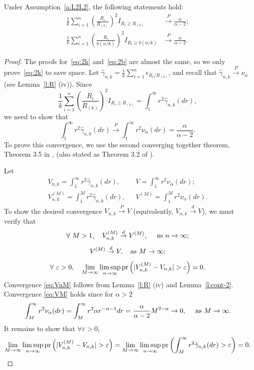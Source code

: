 \documentclass[lineno]{biometrika}
\newcommand \ag{\alpha}
\newcommand \ga{\gamma}
\newcommand \eg{\varepsilon}
\newcommand \ep{\epsilon}
\newcommand\lp{\left (}
\newcommand\rp{\right )}
\def\convP{\stackrel{\mbox{$\scriptstyle P$}}{\rightarrow}}
\def\convd{\stackrel{\mbox{$\scriptstyle d$}}{\rightarrow}}
\begin{document}
\begin{lemma} \label{l:22}
Under Assumption~\ref{a:L2L2}, the following statements hold:
\begin{align}
\frac{1}{k}\sum_{i=1}^n \lp \frac{R_i}{R_{(k)}} \rp^{2}   I_{R_i \ge R_{(k)} }  &\convP \frac{\ag}{\ag-2}; \label{eq:2k}\\
\frac{1}{k}\sum_{i=1}^n \lp \frac{R_i}{b(n/k)} \rp^{2}   I_{R_i \ge b(n/k) } &\convP \frac{\ag}{\ag-2}. \label{eq:2b}
\end{align}

\end{lemma}
\begin{proof}
The proofs for~\eqref{eq:2k} and~\eqref{eq:2b} are almost the same, so we only prove~\eqref{eq:2k} to save space. Let $\hat{\ga}_{n,k}=\frac{1}{k} \sum_{i=1}^n \ep_{R_i / R_{(k)}}$, and recall that $\hat{\ga}_{n,k} \convP \nu_{\ag}$ (see Lemma~\ref{l:R} (iv)). Since
\[
\frac{1}{k}\sum_{i=1}^n \lp \frac{R_i}{R_{(k)}} \rp^{2}   I_{R_i \ge R_{(k)} }= \int_1^\infty r^2 \hat{\ga}_{n,k}(dr),
\]
we need to show that
\[
\int_1^\infty r^2  \hat{\ga}_{n,k}(dr)
\convP \int_1^\infty r^{2} \nu_\ag(dr)=\frac{\ag}{\ag-2}.
\]
To prove this convergence, we use the second converging together theorem, Theorem 3.5
in \citet{resnick:2007}, (also stated as Theorem 3.2 of \citet{billingsley:1999}).

Let
\begin{align*}
V_{n,k} = \int_1^\infty r^2 \hat{\ga}_{n,k}(dr),  \ \ \
&  V= \int_1^\infty r^2 \nu_\ag(dr);\\
V_{n,k}^{(M)} = \int_1^M r^2 \hat{\ga}_{n,k}(dr),  \ \ \
& V^{(M)}= \int_1^M r^2 \nu_\ag(dr).
\end{align*}
To show the desired convergence $V_{n,k} \convP V$ (equivalently, $V_{n,k} \convd V$), we must verify that
\begin{equation} \label{eq:VnM}
\forall \ M > 1, \ \ \ V_{n,k}^{(M)} \convd V^{(M)}, \ \ \ \ {\rm as} \ n \to\infty;
\end{equation}
\begin{equation} \label{eq:VM}
V^{(M)} \convd V, \ \ \ {\rm as} \ M\to\infty;
\end{equation}
\begin{equation} \label{eq:bill}
\forall \ \eg > 0, \ \ \ \lim_{M\to\infty} \limsup_{n\to\infty}
 {\rm pr}\lp | V_{n,k}^{(M)}- V_{n,k} | > \eg \rp = 0.
\end{equation}
Convergence \eqref{eq:VnM} follows from Lemma~\ref{l:R} (iv)
and Lemma~\ref{l:cont-2}. Convergence \eqref{eq:VM} holds since for $\ag>2$
\[
\int_M^\infty r^2 \nu_\ag(dr)=\int_M^\infty r^2 \ag r^{-\ag-1} dr =\frac{\ag}{\ag-2} M^{2-\ag} \to 0, \ \ \ \ {\rm as}\ M \to \infty.
\]
It remains to show that $\forall \eg>0$,
\[
\lim_{M\to\infty} \limsup_{n\to\infty}
 {\rm pr}\lp | V_{n,k}^{(M)}- V_{n,k} | > \eg \rp =  \lim_{M\to\infty} \limsup_{n\to\infty}
 {\rm pr}\lp \int_M^\infty r^2 \hat\ga_{n,k}(dr) > \eg \rp = 0.
\]



\end{proof}
\end{document}
